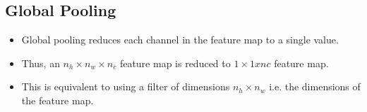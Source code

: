 
\subsection{Global Pooling \cite{gfg-cnn-introduction-to-pooling-layer}}\label{cnn: Global Pooling}
\begin{itemize}
    \item Global pooling reduces each channel in the feature map to a single value.
    
    \item Thus, an $n_h \times n_w \times n_c$ feature map is reduced to $1 \times 1 x nc$ feature map. 

    \item This is equivalent to using a filter of dimensions $n_h \times n_w$ i.e. the dimensions of the feature map.
\end{itemize}

